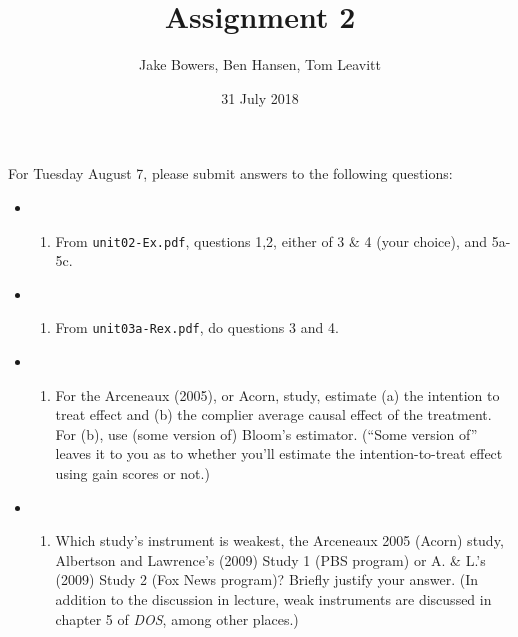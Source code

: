 \documentclass[11pt,]{article}
\title{Assignment 2}
\author{Jake Bowers, Ben Hansen, Tom Leavitt}
\date{31 July 2018}
\begin{document}
\maketitle

For Tuesday August 7, please submit answers to the following questions:

\begin{itemize}
\item
  \begin{enumerate}
  \def\labelenumi{(\Alph{enumi})}
  \itemsep1pt\parskip0pt
  \item
    From \texttt{unit02-Ex.pdf}, questions 1,2, either of 3 \& 4 (your
    choice), and 5a-5c.
  \end{enumerate}
\item
  \begin{enumerate}
  \def\labelenumi{(\Alph{enumi})}
  \setcounter{enumi}{1}
  \itemsep1pt\parskip0pt
  \item
    From \texttt{unit03a-Rex.pdf}, do questions 3 and 4.
  \end{enumerate}
\item
  \begin{enumerate}
  \def\labelenumi{(\Alph{enumi})}
  \setcounter{enumi}{2}
  \itemsep1pt\parskip0pt
  \item
    For the Arceneaux (2005), or Acorn, study, estimate (a) the
    intention to treat effect and (b) the complier average causal effect
    of the treatment. For (b), use (some version of) Bloom's estimator.
    (``Some version of'' leaves it to you as to whether you'll estimate
    the intention-to-treat effect using gain scores or not.)\\
  \end{enumerate}
\item
  \begin{enumerate}
  \def\labelenumi{(\Alph{enumi})}
  \setcounter{enumi}{3}
  \itemsep1pt\parskip0pt
  \item
    Which study's instrument is weakest, the Arceneaux 2005 (Acorn)
    study, Albertson and Lawrence's (2009) Study 1 (PBS program) or A.
    \& L.'s (2009) Study 2 (Fox News program)? Briefly justify your
    answer. (In addition to the discussion in lecture, weak instruments
    are discussed in chapter 5 of \emph{DOS}, among other places.)
  \end{enumerate}
\end{itemize}
\end{document}
